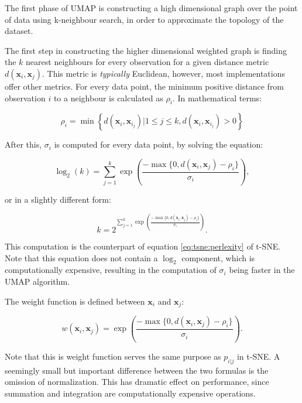 The first phase of UMAP is constructing a high dimensional graph over the point of data using k-neighbour search, in order to approximate the topology of the dataset.

The first step in constructing the higher dimensional weighted graph is finding the $k$ nearest neighbours for every observation for a given distance metric $d(\mathbf{x}_i, \mathbf{x}_j)$. This metric is \textit{typically} Euclidean, however, most implementations offer other metrics. For every data point, the minimum positive distance from observation $i$ to a neighbour is calculated as $\rho_i$. In mathematical terms:

\begin{equation}
	\rho_i = \min \left\lbrace  d(\mathbf{x}_i, \mathbf{x}_{i_j}) \vert 1 \leq j \leq k, d(\mathbf{x}_i, \mathbf{x}_{i_j}) > 0 \right\rbrace
\end{equation}

After this, $\sigma_{i}$ is computed for every data point, by solving the equation:

\begin{equation}
	\log_2(k)=\sum_{j=1}^{k}\exp\left({\frac{-\max\{0,d(\mathbf{x}_i, \mathbf{x}_j)-\rho_i\}}{\sigma_i}}\right),
\end{equation}

or in a slightly different form:

\begin{equation}
	k=2^{\sum_{j=1}^{k}\exp\left({\frac{-\max\{0,d(\mathbf{x}_i, \mathbf{x}_j)-\rho_i\}}{\sigma_i}}\right)}.
\end{equation}

This computation is the counterpart of equation \eqref{eq:tsne:perlexity} of t-SNE. Note that this equation does not contain a $\log_2$ component, which is computationally expensive, resulting in the computation of $\sigma_i$ being faster in the UMAP algorithm.

The weight function is defined between $\mathbf{x}_i$ and $\mathbf{x}_j$:

\begin{equation}
	w(\mathbf{x}_i, \mathbf{x}_j) = \exp\left({\frac{-\max\{0,d(\mathbf{x}_i, \mathbf{x}_j) - \rho_i\}} {\sigma_i}} \right).
\end{equation}

Note that this is weight function serves the same purpose as $p_{i|j}$ in t-SNE. A seemingly small but important difference between  the two formulas is the omission of normalization. This has dramatic effect on performance, since summation and integration are computationally expensive operations.

